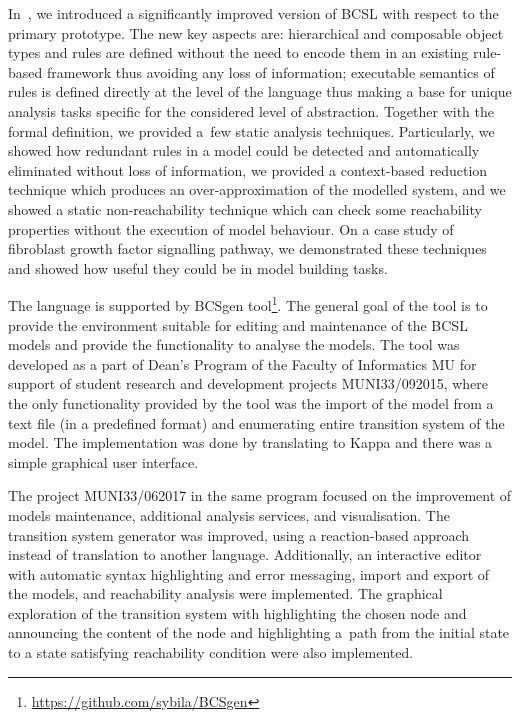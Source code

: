\documentclass[11pt,a4paper]{report}
\begin{document}
In~\cite{trojak2018sasb}, we introduced a significantly improved version of BCSL with respect to the primary prototype. The new key aspects are: hierarchical and composable object types and rules are defined without the need to encode them in an existing rule-based framework thus avoiding any loss of information; executable semantics of rules is defined directly at the level of the language thus making a base for unique analysis tasks specific for the considered level of abstraction. Together with the formal definition, we provided a~few static analysis techniques. Particularly, we showed how redundant rules in a model could be detected and automatically eliminated without loss of information, we provided a context-based reduction technique which produces an over-approximation of the modelled system, and we showed a static non-reachability technique which can check some reachability properties without the execution of model behaviour. On a case study of fibroblast growth factor signalling pathway, we demonstrated these techniques and showed how useful they could be in model building tasks.

The language is supported by BCSgen tool\footnote{\href{https://github.com/sybila/BCSgen}{https://github.com/sybila/BCSgen}}. The general goal of the tool is to provide the environment suitable for editing and maintenance of the BCSL models and provide the functionality to analyse the models. The tool was developed as a part of Dean's Program of the Faculty of Informatics MU for support of student research and development projects MUNI33/092015, where the only functionality provided by the tool was the import of the model from a text file (in a predefined format) and enumerating entire transition system of the model. The implementation was done by translating to Kappa and there was a simple graphical user interface.

The project MUNI33/062017 in the same program focused on the improvement of models maintenance, additional analysis services, and visualisation. The transition system generator was improved, using a reaction-based approach instead of translation to another language. Additionally, an interactive editor with automatic syntax highlighting and error messaging, import and export of the models, and reachability analysis were implemented. The graphical exploration of the transition system with highlighting the chosen node and announcing the content of the node and highlighting a~path from the initial state to a state satisfying reachability condition were also implemented.
\end{document}
